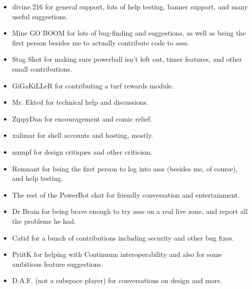 \documentclass{article}
\newcommand{\asss}{asss}
\begin{document}
\begin{itemize}

\item{divine.216} for general support, lots of help testing, banner
support, and many useful suggestions.

\item{Mine GO BOOM} for lots of bug-finding and suggestions, as well as
being the first person besides me to actually contribute code to
\asss{}.

\item{Stag Shot} for making sure powerball isn't left out, timer
features, and other small contributions.

\item{GiGaKiLLeR} for contributing a turf rewards module.

\item{Mr. Ekted} for technical help and discussions.

\item{ZippyDan} for encouragement and comic relief.

\item{xalimar} for shell accounts and hosting, mostly.

\item{numpf} for design critiques and other criticism.

\item{Remnant} for being the first person to log into \asss{} (besides
me, of course), and help testing.

\item{The rest of the PowerBot chat} for friendly conversation and
entertainment.

\item{Dr Brain} for being brave enough to try \asss{} on a real live
zone, and report all the problems he had.

\item{Catid} for a bunch of contributions including security and other
bug fixes.

\item{PriitK} for helping with Continuum interoperability and also for
some ambitious feature suggestions.


\item{D.A.F. (not a subspace player)} for conversations on design and
more.

\end{itemize}
\end{document}
